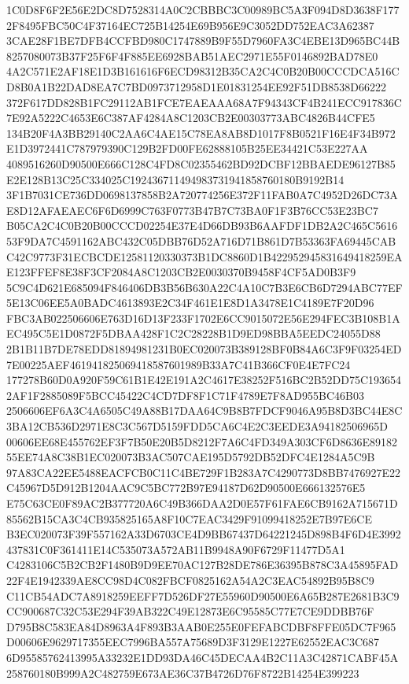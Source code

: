 \documentclass[UTF8,fontset=fandol,zihao=-4,a4paper]{ctexart}
\begin{document}
{{1C0D8F6F2E56E2DC8D7528314A0C2CBBBC3C00989BC5A3F094D8D3638F1772F8495FBC50C4F37164EC725B14254E69B956E9C3052DD752EAC3A62387
3CAE28F1BE7DFB4CCFBD980C1747889B9F55D7960FA3C4EBE13D965BC44B8257080073B37F25F6F4F885EE6928BAB51AEC2971E55F0146892BAD78E0
4A2C571E2AF18E1D3B161616F6ECD98312B35CA2C4C0B20B00CCCDCA516CD8B0A1B22DAD8EA7C7BD0973712958D1E01831254EE92F51DB8538D66222
372F617DD828B1FC29112AB1FCE7EAEAAA68A7F94343CF4B241ECC917836C7E92A5222C4653E6C387AF4284A8C1203CB2E00303773ABC4826B44CFE5
134B20F4A3BB29140C2AA6C4AE15C78EA8AB8D1017F8B0521F16E4F34B972E1D3972441C787979390C129B2FD00FE62888105B25EE34421C53E227AA
4089516260D90500E666C128C4FD8C02355462BD92DCBF12BBAEDE96127B85E2E128B13C25C334025C192436711494983731941858760180B9192B14
3F1B7031CE736DD0698137858B2A720774256E372F11FAB0A7C4952D26DC73AE8D12AFAEAEC6F6D6999C763F0773B47B7C73BA0F1F3B76CC53E23BC7
B05CA2C4C0B20B00CCCD02254E37E4D66DB93B6AAFDF1DB2A2C465C561653F9DA7C4591162ABC432C05DBB76D52A716D71B861D7B53363FA69445CAB
C42C9773F31ECBCDE12581120330373B1DC8860D1B422952945831649418259EAE123FFEF8E38F3CF2084A8C1203CB2E0030370B9458F4CF5AD0B3F9
5C9C4D621E685094F846406DB3B56B630A22C4A10C7B3E6CB6D7294ABC77EF5E13C06EE5A0BADC4613893E2C34F461E1E8D1A3478E1C4189E7F20D96
FBC3AB022506606E763D16D13F233F1702E6CC9015072E56E294FEC3B108B1AEC495C5E1D0872F5DBAA428F1C2C28228B1D9ED98BBA5EEDC24055D88
2B1B11B7DE78EDD81894981231B0EC020073B389128BF0B84A6C3F9F03254ED7E00225AEF461941825069418587601989B33A7C41B366CF0E4E7FC24
177278B60D0A920F59C61B1E42E191A2C4617E38252F516BC2B52DD75C1936542AF1F2885089F5BCC45422C4CD7DF8F1C71F4789E7F8AD955BC46B03
2506606EF6A3C4A6505C49A88B17DAA64C9B8B7FDCF9046A95B8D3BC44E8C3BA12CB536D2971E8C3C567D5159FDD5CA6C4E2C3EEDE3A94182506965D
00606EE68E455762EF3F7B50E20B5D8212F7A6C4FD349A303CF6D8636E8918255EE74A8C38B1EC020073B3AC507CAE195D5792DB52DFC4E1284A5C9B
97A83CA22EE5488EACFCB0C11C4BE729F1B283A7C4290773D8BB7476927E22C45967D5D912B1204AAC9C5BC772B97E94187D62D90500E666132576E5
E75C63CE0F89AC2B377720A6C49B366DAA2D0E57F61FAE6CB9162A715671D85562B15CA3C4CB935825165A8F10C7EAC3429F91099418252E7B97E6CE
B3EC020073F39F557162A33D6703CE4D9BB67437D64221245D898B4F6D4E3992437831C0F361411E14C535073A572AB11B9948A90F6729F11477D5A1
C4283106C5B2CB2F1480B9D9EE70AC127B28DE786E36395B878C3A45895FAD22F4E1942339AE8CC98D4C082FBCF0825162A54A2C3EAC54892B95B8C9
C11CB54ADC7A8918259EEFF7D526DF27E55960D90500E6A65B287E2681B3C9CC900687C32C53E294F39AB322C49E12873E6C95585C77E7CE9DDBB76F
D795B8C583EA84D8963A4F893B3AAB0E255E0FEFABCDBF8FFE05DC7F965D00606E9629717355EEC7996BA557A75689D3F3129E1227E62552EAC3C687
6D95585762413995A33232E1DD93DA46C45DECAA4B2C11A3C42871CABF45A258760180B999A2C482759E673AE36C37B4726D76F8722B14254E399223
}}
\end{document}
